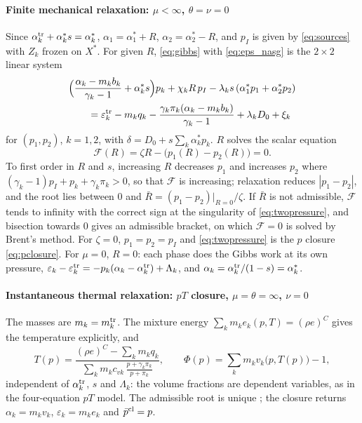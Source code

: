 \documentclass[a4paper,fleqn]{cas-sc}
\begin{document}
\paragraph{Finite mechanical relaxation: $\mu<\infty$, $\theta=\nu=0$}
Since $\alpha^{\rm tr}_k+\alpha^*_ks=\alpha^*_k$, $\alpha_1=\alpha^*_1+R$, $\alpha_2=\alpha^*_2-R$, and $p_I$ is given by \eqref{eq:sources} with $Z_k$
frozen on $X^*$. For given $R$, \eqref{eq:gibbs} with \eqref{eq:eps_nasg} is the $2\times2$ linear system
\begin{equation}
\begin{aligned}
&\Big(\frac{\alpha_k-m_kb_k}{\gamma_k-1}+\alpha^*_ks\Big)p_k+\chi_kR\,p_I-\lambda_ks\,(\alpha^*_1p_1+\alpha^*_2p_2)\\
&\qquad=\varepsilon^{\rm tr}_k-m_kq_k-\frac{\gamma_k\pi_k(\alpha_k-m_kb_k)}{\gamma_k-1}+\lambda_kD_0+\xi_k
\end{aligned}
\label{eq:twopressure}
\end{equation}
for $(p_1,p_2)$, $k=1,2$, with $\delta=D_0+s\sum_k\alpha^*_kp_k$. $R$ solves the scalar equation
\[
\mathcal F(R)=\zeta R-\big(p_1(R)-p_2(R)\big)=0 .
\]
To first order in $R$ and $s$, increasing $R$ decreases $p_1$ and increases $p_2$ where $(\gamma_k-1)p_I+p_k+\gamma_k\pi_k>0$, so that
$\mathcal F$ is increasing; relaxation reduces $|p_1-p_2|$, and the root lies between $0$ and $\bar R=(p_1-p_2)|_{R=0}/\zeta$. If $\bar R$ is not
admissible, $\mathcal F$ tends to infinity with the correct sign at the singularity of \eqref{eq:twopressure}, and bisection towards
$0$ gives an admissible bracket, on which $\mathcal F=0$ is solved by Brent's method. For $\zeta=0$, $p_1=p_2=p_I$ and \eqref{eq:twopressure} is the $p$ closure \eqref{eq:pclosure}. For $\mu=0$, $R=0$: each phase does the Gibbs work at its own pressure,
$\varepsilon_k-\varepsilon^{\rm tr}_k=-p_k(\alpha_k-\alpha^{\rm tr}_k)+\Lambda_k$, and $\alpha_k=\alpha^{\rm tr}_k/(1-s)=\alpha^*_k$.

\paragraph{Instantaneous thermal relaxation: $pT$ closure, $\mu=\theta=\infty$, $\nu=0$}
The masses are $m_k=m^{\rm tr}_k$. The mixture energy $\sum_km_ke_k(p,T)=(\rho e)^C$ gives the temperature explicitly, and
\begin{equation}
T(p)=\frac{(\rho e)^C-\sum_km_kq_k}{\sum_km_kc_{vk}\,\frac{p+\gamma_k\pi_k}{p+\pi_k}},\qquad
\Phi(p)=\sum_km_kv_k\big(p,T(p)\big)-1 ,
\label{eq:pTclosure}
\end{equation}
independent of $\alpha^{\rm tr}_k$, $s$ and $\Lambda_k$: the volume fractions are dependent variables, as in the four-equation $pT$ model.
The admissible root is unique \cite{PelantiShyue2014}; the closure returns $\alpha_k=m_kv_k$, $\varepsilon_k=m_ke_k$ and $\bar p^{\rm cl}=p$.
\end{document}
